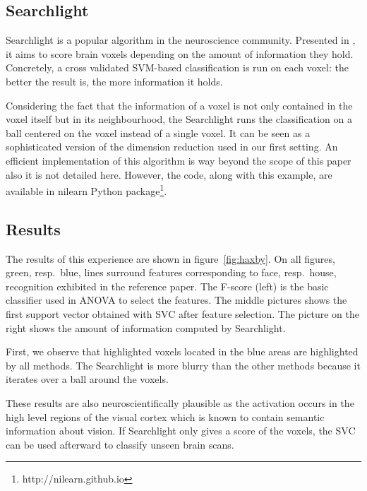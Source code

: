 \documentclass{frontiersSCNS} %
\begin{document}

\subsection{Searchlight}
\label{searchlight}

Searchlight is a popular algorithm in the neuroscience community.
Presented in \cite{kriegeskorte2006}, it aims to score
brain voxels depending on the amount of information they hold. Concretely, a
cross validated SVM-based classification is run on each voxel: the better the
result is, the more information it holds.

Considering the fact that the information of a voxel is not only
contained in the voxel itself but in its neighbourhood, the Searchlight
runs the classification on a ball centered on the voxel instead of a single voxel.
It can be seen as a sophisticated version of the dimension reduction used in our
first setting.
An efficient implementation of this algorithm is way beyond the scope of this
paper also it is not detailed here. However, the code, along with this example,
are available in nilearn Python package\footnote{http://nilearn.github.io}.

\subsection{Results}

The results of this experience are shown in figure~\ref{fig:haxby}.
On all figures, green, resp.\ blue,
lines surround features corresponding to face, resp.\ house, recognition
exhibited in the reference paper.
The F-score (left) is the basic
classifier used in ANOVA to select the features. The middle pictures shows the
first support vector obtained with SVC after feature selection. The picture on
the right shows the amount of information computed by Searchlight.

First, we observe that highlighted voxels located in the blue areas are
highlighted by all methods. The Searchlight is more blurry than the other
methods because it iterates over a ball around the voxels.

These results are also neuroscientifically plausible as the activation occurs in the
high level regions of the visual cortex which is known to contain semantic
information about vision. If Searchlight only gives a score of the voxels, the
SVC can be used afterward to classify unseen brain scans.
\end{document}
